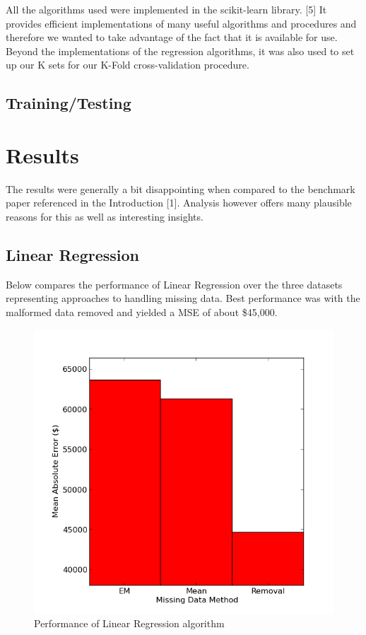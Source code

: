 \documentclass{acm_proc_article-sp}
\begin{document}
	All the algorithms used were implemented in the scikit-learn library. [5] It provides efficient implementations of many useful algorithms and procedures and therefore we wanted to take advantage of the fact that it is available for use. Beyond the implementations of the regression algorithms, it was also used to set up our K sets for our K-Fold cross-validation procedure. 

\subsection{Training/Testing}


\section{Results}
	 The results were generally a bit disappointing when compared to the benchmark paper referenced in the Introduction [1]. Analysis however offers many plausible reasons for this as well as interesting insights. 
	 
\subsection{Linear Regression}
	Below compares the performance of Linear Regression over the three datasets representing approaches to handling missing data. Best performance was with the malformed data removed and yielded a MSE of about \$45,000.
	 
	 \begin{figure}[H]
   		\centering
  		\includegraphics[width=\linewidth]{linear_regression_tuning.png}
    		\caption{Performance of Linear Regression algorithm}
    		\label{fig:linreg}
	\end{figure}
	
\end{document}
